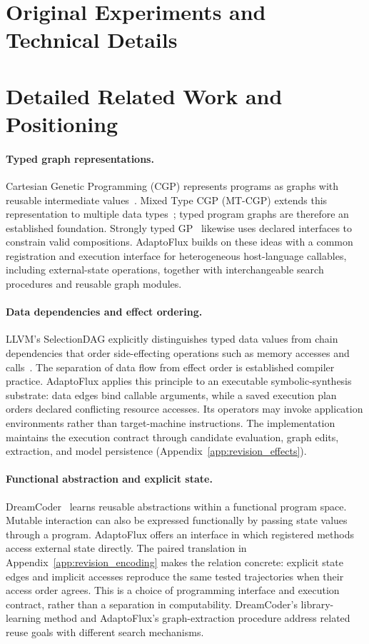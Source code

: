
\section*{Original Experiments and Technical Details}

\section{Detailed Related Work and Positioning}
\label{sec:related_work}

\paragraph{Typed graph representations.}
Cartesian Genetic Programming (CGP) represents programs as graphs with reusable intermediate values~\cite{miller2015cartesian}. Mixed Type CGP (MT-CGP) extends this representation to multiple data types~\cite{harding2012mtcgp}; typed program graphs are therefore an established foundation. Strongly typed GP~\cite{montana1995strongly} likewise uses declared interfaces to constrain valid compositions. AdaptoFlux builds on these ideas with a common registration and execution interface for heterogeneous host-language callables, including external-state operations, together with interchangeable search procedures and reusable graph modules.

\paragraph{Data dependencies and effect ordering.}
LLVM's SelectionDAG explicitly distinguishes typed data values from chain dependencies that order side-effecting operations such as memory accesses and calls~\cite{llvmSelectionDAG}. The separation of data flow from effect order is established compiler practice. AdaptoFlux applies this principle to an executable symbolic-synthesis substrate: data edges bind callable arguments, while a saved execution plan orders declared conflicting resource accesses. Its operators may invoke application environments rather than target-machine instructions. The implementation maintains the execution contract through candidate evaluation, graph edits, extraction, and model persistence (Appendix~\ref{app:revision_effects}).

\paragraph{Functional abstraction and explicit state.}
DreamCoder~\cite{ellis2021dreamcoder} learns reusable abstractions within a functional program space. Mutable interaction can also be expressed functionally by passing state values through a program. AdaptoFlux offers an interface in which registered methods access external state directly. The paired translation in Appendix~\ref{app:revision_encoding} makes the relation concrete: explicit state edges and implicit accesses reproduce the same tested trajectories when their access order agrees. This is a choice of programming interface and execution contract, rather than a separation in computability. DreamCoder's library-learning method and AdaptoFlux's graph-extraction procedure address related reuse goals with different search mechanisms.


